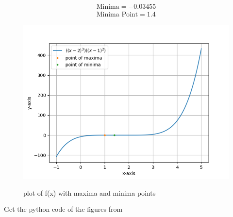 \documentclass[journal,12pt,twocolumn]{IEEEtran}
\begin{document}
    \begin{align}
        \boxed{\text{Minima} =-0.03455}\\
        \boxed{\text{Minima Point} = 1.4}
    \end{align}
\begin{figure}[h!]
\centering
\includegraphics[scale=0.5]{fig/op1.png}  \\
\caption{plot of f(x) with maxima and minima points}
\end{figure}
    
Get the python code of the figures from
\begin{table}[h]
\large
\centering
{}

\end{table}
 
\end{document}
